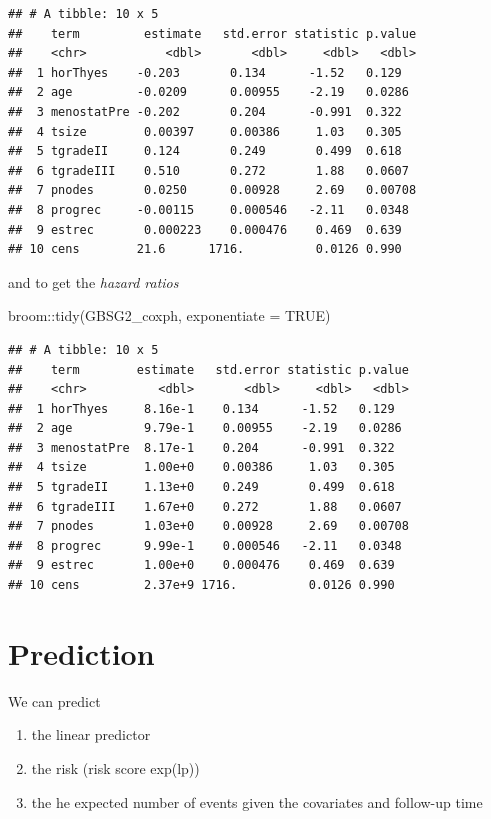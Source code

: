 \documentclass[
]{book}
\makeatletter
\newenvironment{Shaded}{\begin{snugshade}}{\end{snugshade}}
\newcommand{\AttributeTok}[1]{\textcolor[rgb]{0.61,0.61,0.61}{#1}}
\newcommand{\ConstantTok}[1]{\textcolor[rgb]{0,0,0}{#1}}
\newcommand{\FunctionTok}[1]{\textcolor[rgb]{0,0,0}{#1}}
\newcommand{\NormalTok}[1]{#1}
\newcommand{\SpecialCharTok}[1]{\textcolor[rgb]{0,0,0}{#1}}
\providecommand{\tightlist}{%
  \setlength{\itemsep}{0pt}\setlength{\parskip}{0pt}}
\newenvironment{kframe}{%
\medskip{}
\setlength{\fboxsep}{.8em}
 \def\at@end@of@kframe{}%
 \ifinner\ifhmode%
  \def\at@end@of@kframe{\end{minipage}}%
  \begin{minipage}{\columnwidth}%
 \fi\fi%
 \def\FrameCommand##1{\hskip\@totalleftmargin \hskip-\fboxsep
 \colorbox{shadecolor}{##1}\hskip-\fboxsep
     \hskip-\linewidth \hskip-\@totalleftmargin \hskip\columnwidth}%
 \MakeFramed {\advance\hsize-\width
   \@totalleftmargin\z@ \linewidth\hsize
   \@setminipage}}%
 {\par\unskip\endMakeFramed%
 \at@end@of@kframe}
\renewenvironment{Shaded}{\begin{kframe}}{\end{kframe}}
\makeatother
\begin{document}
\begin{verbatim}
## # A tibble: 10 x 5
##    term         estimate   std.error statistic p.value
##    <chr>           <dbl>       <dbl>     <dbl>   <dbl>
##  1 horThyes    -0.203       0.134      -1.52   0.129  
##  2 age         -0.0209      0.00955    -2.19   0.0286 
##  3 menostatPre -0.202       0.204      -0.991  0.322  
##  4 tsize        0.00397     0.00386     1.03   0.305  
##  5 tgradeII     0.124       0.249       0.499  0.618  
##  6 tgradeIII    0.510       0.272       1.88   0.0607 
##  7 pnodes       0.0250      0.00928     2.69   0.00708
##  8 progrec     -0.00115     0.000546   -2.11   0.0348 
##  9 estrec       0.000223    0.000476    0.469  0.639  
## 10 cens        21.6      1716.          0.0126 0.990
\end{verbatim}

and to get the \emph{hazard ratios}

\begin{Shaded}
\begin{Highlighting}[]
\NormalTok{broom}\SpecialCharTok{::}\FunctionTok{tidy}\NormalTok{(GBSG2\_coxph, }\AttributeTok{exponentiate =} \ConstantTok{TRUE}\NormalTok{)}
\end{Highlighting}
\end{Shaded}

\begin{verbatim}
## # A tibble: 10 x 5
##    term        estimate   std.error statistic p.value
##    <chr>          <dbl>       <dbl>     <dbl>   <dbl>
##  1 horThyes     8.16e-1    0.134      -1.52   0.129  
##  2 age          9.79e-1    0.00955    -2.19   0.0286 
##  3 menostatPre  8.17e-1    0.204      -0.991  0.322  
##  4 tsize        1.00e+0    0.00386     1.03   0.305  
##  5 tgradeII     1.13e+0    0.249       0.499  0.618  
##  6 tgradeIII    1.67e+0    0.272       1.88   0.0607 
##  7 pnodes       1.03e+0    0.00928     2.69   0.00708
##  8 progrec      9.99e-1    0.000546   -2.11   0.0348 
##  9 estrec       1.00e+0    0.000476    0.469  0.639  
## 10 cens         2.37e+9 1716.          0.0126 0.990
\end{verbatim}

\hypertarget{prediction-2}{%
\section{Prediction}\label{prediction-2}}

We can predict

\begin{enumerate}
\def\labelenumi{\arabic{enumi}.}
\tightlist
\item
  the linear predictor
\item
  the risk (risk score exp(lp))
\item
  the he expected number of events given the covariates and follow-up time
\end{enumerate}
\end{document}
